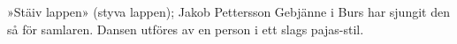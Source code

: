 »Stäiv lappen» (styva lappen);
Jakob Pettersson Gebjänne i Burs har sjungit den så för samlaren. Dansen utföres av en person i ett slags pajas-stil.
